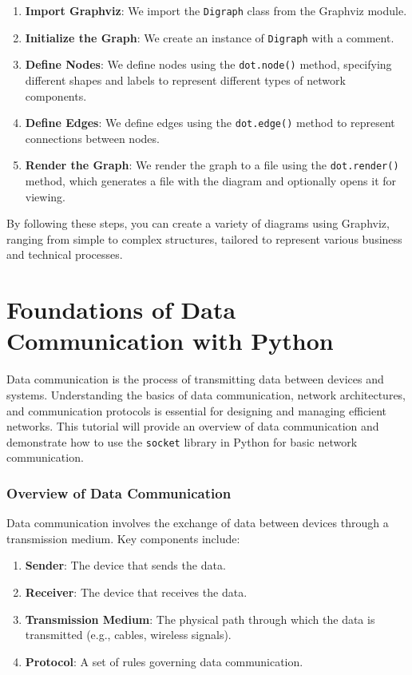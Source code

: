 \documentclass[
  letterpaper,
  DIV=11,
  numbers=noendperiod]{scrreprt}
\providecommand{\tightlist}{%
  \setlength{\itemsep}{0pt}\setlength{\parskip}{0pt}}\usepackage{longtable,booktabs,array}
\begin{document}
\begin{enumerate}
\def\labelenumi{\arabic{enumi}.}
\tightlist
\item
  \textbf{Import Graphviz}: We import the \texttt{Digraph} class from
  the Graphviz module.
\item
  \textbf{Initialize the Graph}: We create an instance of
  \texttt{Digraph} with a comment.
\item
  \textbf{Define Nodes}: We define nodes using the \texttt{dot.node()}
  method, specifying different shapes and labels to represent different
  types of network components.
\item
  \textbf{Define Edges}: We define edges using the \texttt{dot.edge()}
  method to represent connections between nodes.
\item
  \textbf{Render the Graph}: We render the graph to a file using the
  \texttt{dot.render()} method, which generates a file with the diagram
  and optionally opens it for viewing.
\end{enumerate}

By following these steps, you can create a variety of diagrams using
Graphviz, ranging from simple to complex structures, tailored to
represent various business and technical processes.


\chapter{Foundations of Data Communication with
Python}\label{foundations-of-data-communication-with-python}

Data communication is the process of transmitting data between devices
and systems. Understanding the basics of data communication, network
architectures, and communication protocols is essential for designing
and managing efficient networks. This tutorial will provide an overview
of data communication and demonstrate how to use the \texttt{socket}
library in Python for basic network communication.

\subsection{Overview of Data
Communication}\label{overview-of-data-communication}

Data communication involves the exchange of data between devices through
a transmission medium. Key components include:

\begin{enumerate}
\def\labelenumi{\arabic{enumi}.}
\tightlist
\item
  \textbf{Sender}: The device that sends the data.
\item
  \textbf{Receiver}: The device that receives the data.
\item
  \textbf{Transmission Medium}: The physical path through which the data
  is transmitted (e.g., cables, wireless signals).
\item
  \textbf{Protocol}: A set of rules governing data communication.
\end{enumerate}
\end{document}
